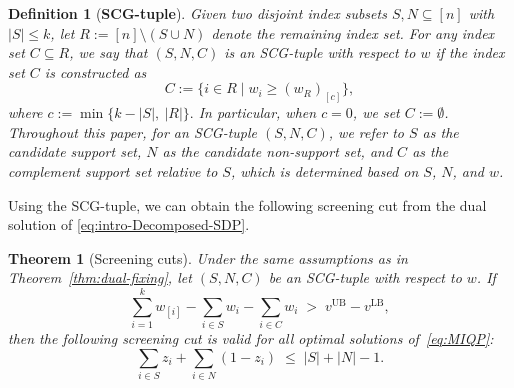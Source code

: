\documentclass[11pt]{article}
\theoremstyle{plain}
\newtheorem{definition}{Definition}
\newtheorem{theorem}{Theorem}
\begin{document}
\begin{definition}[\bf SCG-tuple]\label{def:scg-tuple}
Given two disjoint index subsets $S, N \subseteq [n]$ with $|S| \le k$, let
$
R := [n] \setminus (S \cup N)
$
denote the remaining index set. For any index set $C \subseteq R$, we say that
$(S,N,C)$ is an \emph{SCG-tuple} with respect to $w$ if
the index set $C$ is constructed as
\[
C := \{ i \in R \mid w_i \ge (w_R)_{[c]} \},
\]
where
$
c := \min\{k - |S|,\ |R|\}.
$
In particular, when $c = 0$, we set $C := \emptyset$.
Throughout this paper, for an SCG-tuple $(S,N,C)$, we refer to $S$ as the
\emph{candidate support set}, $N$ as the \emph{candidate non-support set}, and
$C$ as the \emph{complement support set} relative to $S$, which is determined
based on $S$, $N$, and $w$.
\end{definition}

Using the SCG-tuple, we can obtain the following screening cut from the dual solution of \eqref{eq:intro-Decomposed-SDP}.

\begin{theorem}[Screening cuts]\label{thm:screening-cuts}
Under the same assumptions as in Theorem~\ref{thm:dual-fixing}, let $(S,N,C)$ be an SCG-tuple with respect to $w$. If
\[
\sum_{i=1}^k w_{[i]} - \sum_{i\in S} w_i - \sum_{i\in C} w_i \;>\; v^{\mathrm{UB}} - v^{\mathrm{LB}},
\]
then the following screening cut is valid for all optimal solutions of~\eqref{eq:MIQP}:
\[
\sum_{i\in S} z_i + \sum_{i\in N} (1 - z_i) \;\le\; |S| + |N| - 1 .
\]
\end{theorem}
\end{document}
